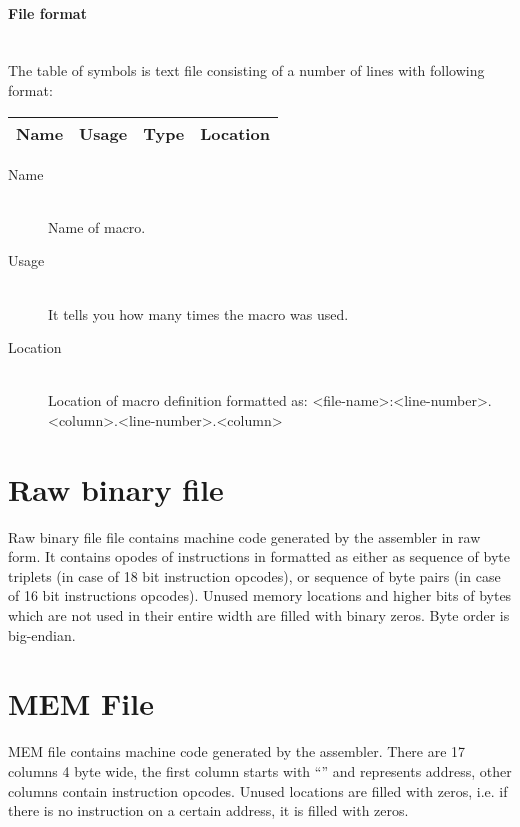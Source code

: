     \paragraph{File format}
        ~\\
        The table of symbols is text file consisting of a number of lines with following format:\\
        \begin{tabular}{|cccc|}
            \hline
            Name & Usage & Type & Location \\
            \hline
        \end{tabular}

    \begin{description}
        \item[Name]~\\
            Name of macro.
        \item[Usage]~\\
            It tells you how many times the macro was used.
        \item[Location]~\\
            Location of macro definition formatted as: <file-name>:<line-number>.<column>.<line-number>.<column>
    \end{description}

\section{Raw binary file}
    Raw binary file file contains machine code generated by the assembler in raw form. It contains opodes of instructions in formatted as either as sequence of byte triplets (in case of 18 bit instruction opcodes), or sequence of byte pairs (in case of 16 bit instructions opcodes). Unused memory locations and higher bits of bytes which are not used in their entire width are filled with binary zeros. Byte order is big-endian.

\clearpage
\section{MEM File}
    MEM file contains machine code generated by the assembler. There are 17 columns 4 byte wide, the first column starts with ``\@'' and represents address, other columns contain instruction opcodes. Unused locations are filled with zeros, i.e. if there is no instruction on a certain address, it is filled with zeros.

